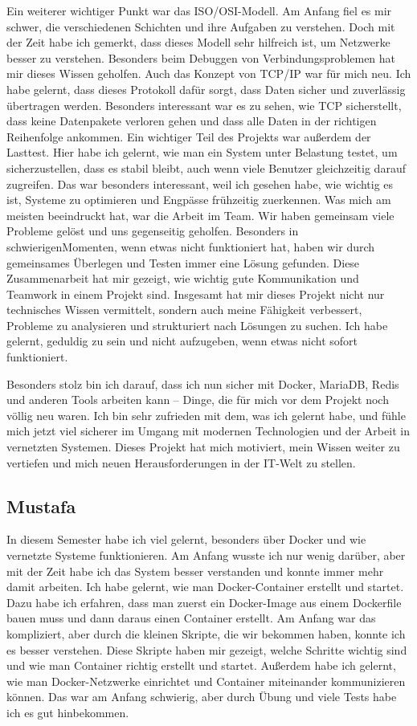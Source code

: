 Ein weiterer wichtiger Punkt war das ISO/OSI-Modell. Am Anfang fiel es mir schwer, die verschiedenen Schichten und ihre Aufgaben zu verstehen. Doch mit der Zeit habe ich gemerkt, dass dieses Modell sehr hilfreich ist, um Netzwerke besser zu verstehen. Besonders beim Debuggen von Verbindungsproblemen hat mir dieses Wissen geholfen. Auch das Konzept von TCP/IP war für mich neu. Ich habe gelernt, dass dieses Protokoll dafür sorgt, dass Daten sicher und zuverlässig übertragen werden. Besonders interessant war es zu sehen, wie TCP sicherstellt, dass keine Datenpakete verloren gehen und dass alle Daten in der richtigen Reihenfolge ankommen. Ein wichtiger Teil des Projekts war außerdem der Lasttest. Hier habe ich gelernt, wie man ein System unter Belastung testet, um sicherzustellen, dass es stabil bleibt, auch wenn viele Benutzer gleichzeitig darauf zugreifen. Das war besonders interessant, weil ich gesehen habe, wie wichtig es ist, Systeme zu optimieren und Engpässe frühzeitig zuerkennen. Was mich am meisten beeindruckt hat, war die Arbeit im Team. Wir haben gemeinsam viele Probleme gelöst und uns gegenseitig geholfen. Besonders in schwierigenMomenten, wenn etwas nicht funktioniert hat, haben wir durch gemeinsames Überlegen und Testen immer eine Lösung gefunden. Diese Zusammenarbeit hat mir gezeigt, wie wichtig gute Kommunikation und Teamwork in einem Projekt sind. Insgesamt hat mir dieses Projekt nicht nur technisches Wissen vermittelt, sondern auch meine Fähigkeit verbessert, Probleme zu analysieren und strukturiert nach Lösungen zu suchen. Ich habe gelernt, geduldig zu sein und nicht aufzugeben, wenn etwas nicht sofort funktioniert.

Besonders stolz bin ich darauf, dass ich nun sicher mit Docker, MariaDB, Redis und anderen Tools arbeiten kann – Dinge, die für mich vor dem Projekt noch völlig neu waren. Ich bin sehr zufrieden mit dem, was ich gelernt habe, und fühle mich jetzt viel sicherer im Umgang mit modernen Technologien und der Arbeit in vernetzten Systemen. Dieses Projekt hat mich motiviert, mein Wissen weiter zu vertiefen und mich neuen Herausforderungen in der IT-Welt zu stellen.

\subsection{Mustafa}
In diesem Semester habe ich viel gelernt, besonders über Docker und wie vernetzte Systeme funktionieren. Am Anfang wusste ich nur wenig darüber, aber mit der Zeit habe ich das System besser verstanden und konnte immer mehr damit arbeiten. Ich habe gelernt, wie man Docker-Container erstellt und startet. Dazu habe ich erfahren, dass man zuerst ein Docker-Image aus einem Dockerfile bauen muss und dann daraus einen Container erstellt. Am Anfang war das kompliziert, aber durch die kleinen Skripte, die wir bekommen haben, konnte ich es besser verstehen. Diese Skripte haben mir gezeigt, welche Schritte wichtig sind und wie man Container richtig erstellt und startet. Außerdem habe ich gelernt, wie man Docker-Netzwerke einrichtet und Container miteinander kommunizieren können. Das war am Anfang schwierig, aber durch Übung und viele Tests habe ich es gut hinbekommen.

